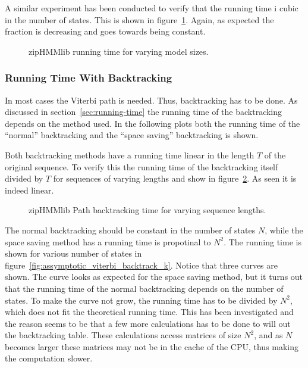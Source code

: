 A similar experiment has been conducted to verify that the running time i cubic
in the number of states. This is shown in
figure~\ref{fig:assymptotic_viterbi_k}. Again, as expected the fraction is
decreasing and goes towards being constant.

\begin{figure}
  \centering
  
  \caption{zipHMMlib running time for varying model sizes.}
  \label{fig:assymptotic_viterbi_k}
\end{figure}

\subsubsection{Running Time With Backtracking}

In most cases the Viterbi path is needed. Thus, backtracking has to be
done. As discussed in section~\ref{sec:running-time} the running time of the
backtracking depends on the method used. In the following plots both the
running time of the ``normal'' backtracking and the ``space saving''
backtracking is shown.

Both backtracking methods have a running time linear in the length $T$ of the
original sequence. To verify this the running time of the backtracking itself
divided by $T$ for sequences of varying lengths and show in
figure~\ref{fig:assymptotic_viterbi_backtrack_n}. As seen it is indeed
linear.

\begin{figure}
  \centering
  
  \caption{zipHMMlib Path backtracking time for varying sequence lengths.}
  \label{fig:assymptotic_viterbi_backtrack_n}
\end{figure}

The normal backtracking should be constant in the number of states $N$, while
the space saving method has a running time is propotinal to $N^2$. The running
time is shown for various number of states in
figure~\ref{fig:assymptotic_viterbi_backtrack_k}. Notice that three curves are
shown. The curve looks as expected for the space saving method, but it turns
out that the running time of the normal backtracking depends on the number of
states. To make the curve not grow, the running time has to be divided by
$N^2$, which does not fit the theoretical running time. This has been
investigated and the reason seems to be that a few more calculations has to be
done to will out the backtracking table. These calculations access matrices of
size $N^2$, and as $N$ becomes larger these matrices may not be in the cache of
the CPU, thus making the computation slower. 


